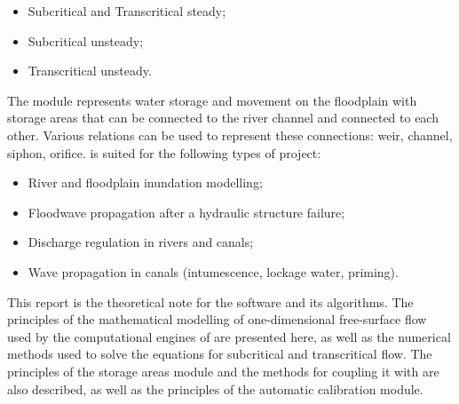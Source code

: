 \documentclass[Mascaret]{../../data/TelemacDoc} %
\begin{document}
\begin{itemize}
 \item Subcritical and Transcritical steady;
 \item Subcritical unsteady;
 \item Transcritical unsteady.
\end{itemize}

The \casier{} module represents water storage and movement on the floodplain with storage areas that can be connected to the river channel and connected to each other. Various relations can be used to represent these connections: weir, channel, siphon, orifice.
\mascaret{} is suited for the following types of project:

\begin{itemize}
 \item River and floodplain inundation modelling;
 \item Floodwave propagation after a hydraulic structure failure;
 \item Discharge regulation in rivers and canals;
 \item Wave propagation in canals (intumescence, lockage water, priming).
\end{itemize}

This report is the theoretical note for the software \mascaret{} and its algorithms. The principles of the mathematical modelling of one-dimensional free-surface flow used by the computational engines of \mascaret{} are presented here, as well as the numerical methods used to solve the equations for subcritical and transcritical flow. The principles of the storage areas module \casier{} and the methods for coupling it with \mascaret{} are also described, as well as the principles of the automatic calibration module.




\newpage

\thispagestyle{empty}

\TelemacCopyright{}




\pagestyle{empty} %
\end{document}
